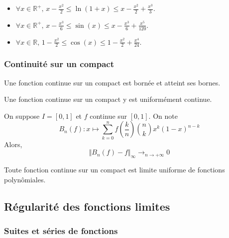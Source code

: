 	\begin{application}
		\begin{itemize}
			\item $\forall x \in \mathbb{R}^+, \, x - \frac{x^2}{2} \leq \ln(1+x) \leq x - \frac{x^2}{2} + \frac{x^3}{3}$.
			\item $\forall x \in \mathbb{R}^+, \, x - \frac{x^3}{6} \leq \sin(x) \leq x - \frac{x^3}{6} + \frac{x^5}{120}$.
			\item $\forall x \in \mathbb{R}, \, 1 - \frac{x^2}{2} \leq \cos(x) \leq 1 - \frac{x^2}{2} + \frac{x^4}{24}$.
		\end{itemize}
	\end{application}

	\subsubsection{Continuité sur un compact}


	\begin{proposition}
		Une fonction continue sur un compact est bornée et atteint ses bornes.
	\end{proposition}

	\begin{theorem}[Heine]
		Une fonction continue sur un compact y est uniformément continue.
	\end{theorem}


  \begin{theorem}[Bernstein]
		On suppose $I = [0,1]$ et $f$ continue sur $[0,1]$. On note
    \[ B_n(f) : x \mapsto \sum_{k=0}^{n} f\left(\frac{k}{n}\right) \binom{n}{k} x^k (1-x)^{n-k} \]
    Alors,
    \[ \Vert B_n(f) - f \Vert_\infty \longrightarrow_{n \rightarrow +\infty} 0 \]
  \end{theorem}


	\begin{theorem}[Weierstrass]
		Toute fonction continue sur un compact est limite uniforme de fonctions polynômiales.
	\end{theorem}

	\subsection{Régularité des fonctions limites}

	\subsubsection{Suites et séries de fonctions}

